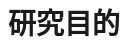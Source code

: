 \documentclass[twoside,twocolumn,10pt]{jarticle}  %
\begin{document}
\section{研究目的}

\end{document}
